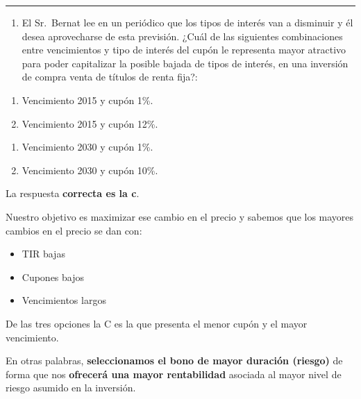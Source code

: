 \documentclass[
  letterpaper,
  DIV=11,
  numbers=noendperiod]{scrreprt}
\providecommand{\tightlist}{%
  \setlength{\itemsep}{0pt}\setlength{\parskip}{0pt}}\usepackage{longtable,booktabs,array}
\begin{document}
\begin{center}\rule{0.5\linewidth}{0.5pt}\end{center}

\begin{enumerate}
\def\labelenumi{\arabic{enumi}.}
\setcounter{enumi}{62}
\tightlist
\item
  El Sr.~Bernat lee en un periódico que los tipos de interés van a
  disminuir y él desea aprovecharse de esta previsión. ¿Cuál de las
  siguientes combinaciones entre vencimientos y tipo de interés del
  cupón le representa mayor atractivo para poder capitalizar la posible
  bajada de tipos de interés, en una inversión de compra venta de
  títulos de renta fija?:
\end{enumerate}

\begin{enumerate}
\def\labelenumi{\alph{enumi})}
\item
  Vencimiento 2015 y cupón 1\%.
\item
  Vencimiento 2015 y cupón 12\%.
\end{enumerate}

\begin{enumerate}
\def\labelenumi{\Alph{enumi})}
\setcounter{enumi}{2}
\item
  Vencimiento 2030 y cupón 1\%.
\item
  Vencimiento 2030 y cupón 10\%.
\end{enumerate}

\begin{tcolorbox}[enhanced jigsaw, left=2mm, opacityback=0, colback=white, breakable, arc=.35mm, bottomrule=.15mm, rightrule=.15mm, toprule=.15mm, leftrule=.75mm, colframe=quarto-callout-tip-color-frame]
\begin{minipage}[t]{5.5mm}
\textcolor{quarto-callout-tip-color}{\faLightbulb}
\end{minipage}%
\begin{minipage}[t]{\textwidth - 5.5mm}

La respuesta \textbf{correcta es la c}.

Nuestro objetivo es maximizar ese cambio en el precio y sabemos que los
mayores cambios en el precio se dan con:

\begin{itemize}
\item
  TIR bajas
\item
  Cupones bajos
\item
  Vencimientos largos
\end{itemize}

De las tres opciones la C es la que presenta el menor cupón y el mayor
vencimiento.

En otras palabras, \textbf{seleccionamos el bono de mayor duración
(riesgo)} de forma que nos \textbf{ofrecerá una mayor rentabilidad}
asociada al mayor nivel de riesgo asumido en la inversión.

\end{minipage}%
\end{tcolorbox}
\end{document}
